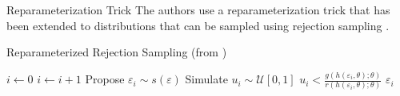 \begin{frame}{Reparameterization Trick} %
  The authors use a reparameterization trick that has been extended to distributions that can be sampled using rejection sampling \cite{naesseth2020reparameterization}.
  
  \begin{algorithm}[H]
    \caption{Reparameterized Rejection Sampling (from \cite{naesseth2020reparameterization})}\label{alg:rejectionsampling}
    \begin{algorithmic}[1]
    \STATE $i \gets 0$
    \REPEAT 
    \STATE $i \gets i +1 $
    \STATE Propose $\varepsilon_i \sim s(\varepsilon)$
    \STATE Simulate $u_i \sim \mathcal{U}[0,1]$
    \UNTIL $u_i < \frac{g\left(h(\varepsilon_i,\theta); \theta\right)}{r\left(h(\varepsilon_i,\theta) ; \theta\right)}$
    \RETURN $\varepsilon_i$
    \end{algorithmic}
    \end{algorithm}

  \end{frame}

  

  
  

